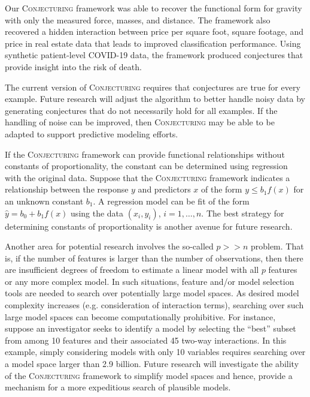 \documentclass[ijds,nonblindrev]{informs-ijds}
\begin{document}
Our \textsc{Conjecturing} framework was able to recover the functional form for gravity with only the measured force, masses, and distance.  The framework also recovered a hidden interaction between price per square foot, square footage, and price in real estate data that leads to improved classification performance.  Using synthetic patient-level COVID-19 data, the framework produced conjectures that provide insight into the risk of death.  

The current version of \textsc{Conjecturing} requires that conjectures are true for every example.  Future research will adjust the algorithm to better handle noisy data by generating conjectures that do not necessarily hold for all examples.  If the handling of noise can be improved, then \textsc{Conjecturing} may be able to be adapted to support predictive modeling efforts.  

If the \textsc{Conjecturing} framework can provide functional relationships without constants of proportionality, the constant can be determined using regression with the original data.  Suppose that the \textsc{Conjecturing} framework indicates a relationship between the response $y$ and predictors $x$ of the form $y \leq b_1 f(x)$ for an unknown constant $b_1$.  A regression model can be fit of the form $\hat{y} = b_0 + b_1 f(x)$ using the data $(x_i, y_i)$, $i=1,\ldots,n$.  The best strategy for determining constants of proportionality is another avenue for future research.  

Another area for potential research involves the so-called $p >> n$ problem. That is, if the number of features is larger than the number of observations, then there are insufficient degrees of freedom to estimate a linear model with all $p$ features or any more complex model.  In such situations, feature and/or model selection tools are needed to search over potentially large model spaces. As desired model complexity increases (e.g. consideration of interaction terms), searching over such large model spaces can become computationally prohibitive. For instance, suppose an investigator seeks to identify a  model by selecting the ``best'' subset from among 10 features and their associated 45 two-way interactions. In this example, simply considering models with only 10 variables requires searching over a model space larger than 2.9 billion. Future research will investigate the ability of the \textsc{Conjecturing} framework to simplify model spaces and hence, provide a mechanism for a more expeditious search of plausible models.   
\end{document}
